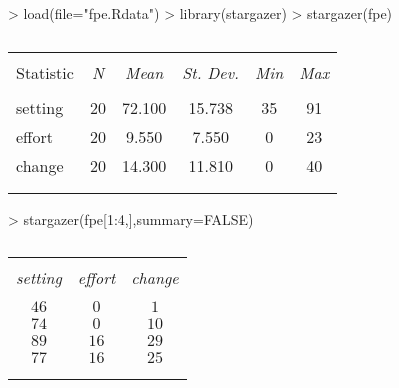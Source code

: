 \documentclass{article}
\begin{document}
\begin{Schunk}
\begin{Sinput}
> load(file="fpe.Rdata")
> library(stargazer)
> stargazer(fpe)
\end{Sinput}
% Table created by StarGazer v.2.0.1 by Marek Hlavac, Harvard University. E-mail: hlavac at fas.harvard.edu
% Date and time: Mon, Jan 14, 2013 - 21:31:37
\begin{table}[htb] \centering 
  \caption{} 
\footnotesize 

\begin{tabular}{@{\extracolsep{5pt}}l c c c c c } 
\\[-1.8ex]\hline 
\hline \\[-1.8ex] 
Statistic & \multicolumn{1}{c}{\textit{N}} & \multicolumn{1}{c}{\textit{Mean}} & \multicolumn{1}{c}{\textit{St. Dev.}} & \multicolumn{1}{c}{\textit{Min}} & \multicolumn{1}{c}{\textit{Max}} \\ 
\hline \\[-1.8ex] 
setting & 20 & 72.100 & 15.738 & 35 & 91 \\ 
effort & 20 & 9.550 & 7.550 & 0 & 23 \\ 
change & 20 & 14.300 & 11.810 & 0 & 40 \\ 
\hline \\[-1.8ex] 
\normalsize 
\end{tabular} 
\end{table} \begin{Sinput}
> stargazer(fpe[1:4,],summary=FALSE)
\end{Sinput}
% Table created by StarGazer v.2.0.1 by Marek Hlavac, Harvard University. E-mail: hlavac at fas.harvard.edu
% Date and time: Mon, Jan 14, 2013 - 21:31:37
\begin{table}[htb] \centering 
  \caption{} 
\footnotesize 

\begin{tabular}{@{\extracolsep{5pt}} c c c } 
\\[-1.8ex]\hline 
\hline \\[-1.8ex] 
\textit{setting} & \textit{effort} & \textit{change} \\ 
\hline \\[-1.8ex] 
$46$ & $0$ & $1$ \\ 
$74$ & $0$ & $10$ \\ 
$89$ & $16$ & $29$ \\ 
$77$ & $16$ & $25$ \\ 
\hline \\[-1.8ex] 
\normalsize 
\end{tabular} 
\end{table} \end{Schunk}
\end{document}
